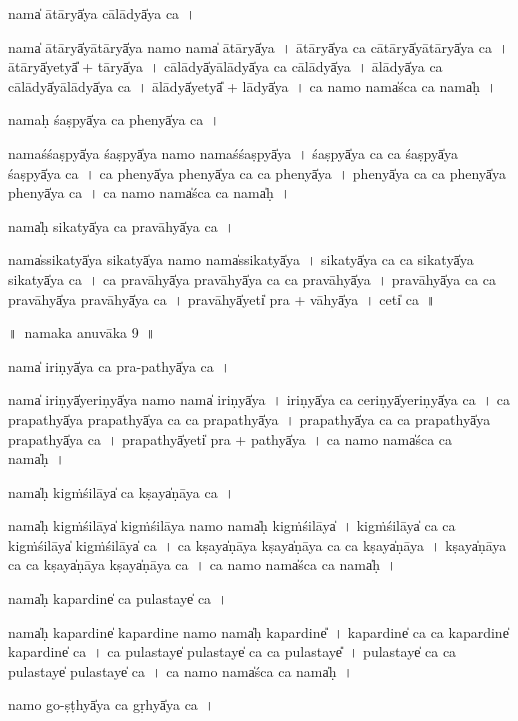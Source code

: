 \documentclass[parskip, DIV=14]{scrartcl}
\begin{document}
{nama̍ ātā॒ryā̍ya cālā॒dyā̍ya ca॒~।

nama̍ ātā॒ryā̍yātā॒ryā̍ya॒ namo॒ nama̍ ātā॒ryā̍ya~।
ā॒tā॒ryā̍ya ca cātā॒ryā̍yātā॒ryā̍ya ca~।
ā॒tā॒ryā̍yetyā̎ + tā॒ryā̍ya~।
cā॒lā॒dyā̍yālā॒dyā̍ya ca  cālā॒dyā̍ya~।
ā॒lā॒dyā̍ya ca cālā॒dyā̍yālā॒dyā̍ya ca~।
ā॒lā॒dyā̍yetyā̎ + lā॒dyā̍ya~।
ca॒ namo॒ nama̍śca ca॒ nama̍ḥ~।

nama॒ḥ śaṣpyā̍ya ca॒ phenyā̍ya ca॒~।

nama॒śśaṣpyā̍ya॒ śaṣpyā̍ya॒ namo॒ nama॒śśaṣpyā̍ya~।
śaṣpyā̍ya ca ca॒ śaṣpyā̍ya॒ śaṣpyā̍ya ca~।
ca॒ phenyā̍ya॒ phenyā̍ya ca ca॒ phenyā̍ya~।
phenyā̍ya ca ca॒ phenyā̍ya॒ phenyā̍ya ca~।
ca॒ namo॒ nama̍śca ca॒ nama̍ḥ~।

nama̍ḥ sika॒tyā̍ya ca pravā॒hyā̍ya ca~।

nama̍ssika॒tyā̍ya sika॒tyā̍ya॒ namo॒ nama̍ssika॒tyā̍ya~।
si॒ka॒tyā̍ya ca ca sika॒tyā̍ya sika॒tyā̍ya ca~।
ca॒ pra॒vā॒hyā̍ya pravā॒hyā̍ya ca ca pravā॒hyā̍ya~।
pra॒vā॒hyā̍ya ca ca pravā॒hyā̍ya pravā॒hyā̍ya ca~।
pra॒vā॒hyā̍yeti̍ pra + vā॒hyā̍ya~।
ceti̍ ca~॥

\newpage
\LARGE
॥~namaka anuvāka 9~॥ 
\Large

nama̍ iri॒ṇyā̍ya ca pra-pa॒thyā̍ya ca॒~।

nama̍ iri॒ṇyā̍yeri॒ṇyā̍ya॒ namo॒ nama̍ iri॒ṇyā̍ya~।
i॒ri॒ṇyā̍ya ca ceri॒ṇyā̍yeri॒ṇyā̍ya ca~।
ca॒ pra॒pa॒thyā̍ya prapa॒thyā̍ya ca ca prapa॒thyā̍ya~।
pra॒pa॒thyā̍ya ca ca prapa॒thyā̍ya prapa॒thyā̍ya ca~।
pra॒pa॒thyā̍yeti̍ pra + pa॒thyā̍ya~।
ca॒ namo॒ nama̍śca ca॒ nama̍ḥ~।

nama̍ḥ kigṁśi॒lāya̍ ca॒ kṣaya̍ṇāya ca॒~।

nama̍ḥ kigṁśi॒lāya̍ kigṁśi॒lāya॒ namo॒ nama̍ḥ kigṁśi॒lāya̍~।
ki॒gṁ॒śi॒lāya̍ ca ca kigṁśi॒lāya̍ kigṁśi॒lāya̍ ca~।
ca॒ kṣaya̍ṇāya॒ kṣaya̍ṇāya ca ca॒ kṣaya̍ṇāya~।
kṣaya̍ṇāya ca ca॒ kṣaya̍ṇāya॒ kṣaya̍ṇāya ca~।
ca॒ namo॒ nama̍śca ca॒ nama̍ḥ~।

nama̍ḥ kapa॒rdine̍ ca pula॒staye̍ ca॒~।

nama̍ḥ kapa॒rdine̍ kapa॒rdine॒ namo॒ nama̍ḥ kapa॒rdine̎~।
ka॒pa॒rdine̍ ca ca kapa॒rdine̍ kapa॒rdine̍ ca~।
ca॒ pu॒la॒staye̍ pula॒staye̍ ca  ca  pula॒staye̎~।
pu॒la॒staye̍ ca ca pula॒staye̍ pula॒staye̍ ca~।
ca॒ namo॒ nama̍śca ca॒ nama̍ḥ~।

namo॒ go-ṣṭhyā̍ya ca॒ gṛhyā̍ya ca॒~।

}
\end{document}
